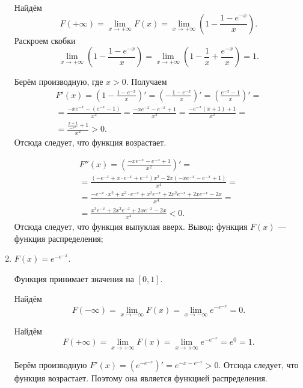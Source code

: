 \begin{enumerate}[label=\alph*)]
Найдём
$$F \left( + \infty \right) =
\lim \limits_{x \to + \infty } F \left( x \right) =
\lim \limits_{x \to + \infty } \left( 1 - \frac{1-e^{-x}}{x} \right).$$
Раскроем скобки
$$\lim \limits_{x \to + \infty } \left( 1 - \frac{1-e^{-x}}{x} \right) =
\lim \limits_{x \to + \infty } \left( 1 - \frac{1}{x} + \frac{e^{-x}}{x} \right) =
1.$$

Берём производную, где $x > 0$.
Получаем
\begin{equation*}
\begin{split}
F' \left( x \right) =
\left( 1 - \frac{1-e^{-x}}{x} \right)' =
\left( - \frac{1-e^{-x}}{x} \right)' =
\left( \frac{e^{-x}-1}{x} \right)' = \\
= \frac{-xe^{-x}- \left( e^{-x}-1 \right) }{x^2} =
\frac{-xe^{-x}-e^{-x}+1}{x^2} =
\frac{-e^{-x} \left( x+1 \right) +1}{x^2} = \\
= \frac{ \frac{x+1}{-e^x} + 1}{x^2} > 0.
\end{split}
\end{equation*}
Отсюда следует, что функция возрастает.

\begin{equation*}
\begin{split}
F'' \left( x \right) =
\left( \frac{-xe^{-x}-e^{-x}+1}{x^2} \right)' = \\
= \frac{ \left( -e^{-x}+x \cdot e^{-x}+e^{-x} \right) x^2 - 2x \left( -xe^{-x}-e^{-x}+1 \right) }{x^4} = \\
= \frac{-e^{-x} \cdot x^2 + x^3 \cdot e^{-x}+x^2e^{-x} + 2x^2e^{-x}+2xe^{-x}-2x}{x^4} = \\
= \frac{x^3e^{-x}+2x^2e^{-x}+2xe^{-x}-2x}{x^4} < 0.
\end{split}
\end{equation*}
Отсюда следует, что функция выпуклая вверх.
Вывод: функция $F \left( x \right) $ --- функция распределения;
\item $F \left( x \right) = e^{-e^{-x}}$.

Функция принимает значения на $ \left[ 0, 1 \right] $.

Найдём
$$F \left( - \infty \right) =
\lim \limits_{x \to - \infty } F \left( x \right) =
\lim \limits_{x \to - \infty } e^{-e^{-x}} =
0.$$

Найдём
$$F \left( + \infty \right) =
\lim \limits_{x \to + \infty } F \left( x \right) =
\lim \limits_{x \to + \infty } e^{-e^{-x}} =
e^0 =
1.$$

Берём производную $F' \left( x \right) = \left( e^{-e^{-x}} \right)' = e^{-x-e^{-x}} > 0$.
Отсюда следует, что функция возрастает.
Поэтому она является функцией распределения.
\end{enumerate}

